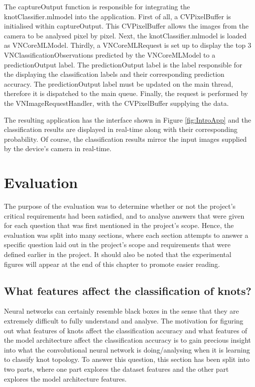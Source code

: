 \documentclass{l4proj}
\begin{document}
The captureOutput function is responsible for integrating the knotClassifier.mlmodel into the application.
First of all, a CVPixelBuffer is initialised within captureOutput.
This CVPixelBuffer allows the images from the camera to be analysed pixel by pixel.
Next, the knotClassifier.mlmodel is loaded as VNCoreMLModel.
Thirdly, a VNCoreMLRequest is set up to display the top 3 VNClassificationObservations predicted by the VNCoreMLModel to a predictionOutput label.
The predictionOutput label is the label responsible for the displaying the classification labels and their corresponding prediction accuracy.
The predictionOutput label must be updated on the main thread, therefore it is dispatched to the main queue.
Finally, the request is performed by the VNImageRequestHandler, with the CVPixelBuffer supplying the data.

The resulting application has the interface shown in Figure \ref{fig:IntroApp} and the classification results are displayed in real-time along with their corresponding probability.
Of course, the classification results mirror the input images supplied by the device's camera in real-time. 




\chapter{Evaluation}

The purpose of the evaluation was to determine whether or not the project's critical requirements had been satisfied, and to analyse answers that were given for each question that was first mentioned in the project's scope.
Hence, the evaluation was split into many sections, where each section attempts to answer a specific question laid out in the project's scope and requirements that were defined earlier in the project.
It should also be noted that the experimental figures will appear at the end of this chapter to promote easier reading.

\section{What features affect the classification of knots?}

Neural networks can certainly resemble black boxes in the sense that they are extremely difficult to fully understand and analyse.
The motivation for figuring out what features of knots affect the classification accuracy and what features of the model architecture affect the classification accuracy is to gain precious insight into what the convolutional neural network is doing/analysing when it is learning to classify knot topology.
To answer this question, this section has been split into two parts, where one part explores the dataset features and the other part explores the model architecture features.  
\end{document}
